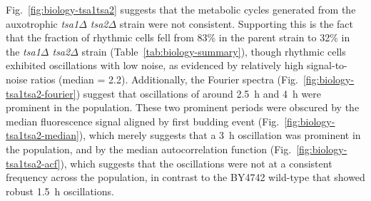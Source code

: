 Fig.\ \ref{fig:biology-tsa1tsa2} suggests that the metabolic cycles generated from the auxotrophic \textit{tsa1$\Delta$ tsa2$\Delta$} strain were not consistent. %
Supporting this is the fact that the fraction of rhythmic cells fell from 83\% in the parent strain to 32\% in the \textit{tsa1$\Delta$ tsa2$\Delta$} strain (Table~\ref{tab:biology-summary}), though rhythmic cells exhibited oscillations with low noise, as evidenced by relatively high signal-to-noise ratios (median = 2.2).
Additionally, the Fourier spectra (Fig.\ \ref{fig:biology-tsa1tsa2-fourier}) suggest that oscillations of around \SI{2.5}{\hour} and \SI{4}{\hour} were prominent in the population.
These two prominent periods were obscured by the median fluorescence signal aligned by first budding event (Fig.\ \ref{fig:biology-tsa1tsa2-median}), which merely suggests that a \SI{3}{\hour} oscillation was prominent in the population, and by the median autocorrelation function (Fig.\ \ref{fig:biology-tsa1tsa2-acf}), which suggests that the oscillations were not at a consistent frequency across the population, in contrast to the BY4742 wild-type that showed robust \SI{1.5}{\hour} oscillations.


